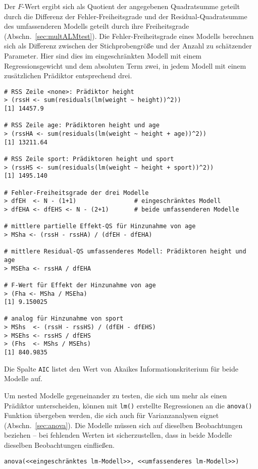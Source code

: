 Der $F$-Wert ergibt sich als Quotient der angegebenen Quadratsumme geteilt durch die Differenz der Fehler-Freiheitsgrade und der Residual-Quadratsumme des umfassenderen Modells geteilt durch ihre Freiheitsgrade (Abschn.\ \ref{sec:multALMtest}). Die Fehler-Freiheitsgrade eines Modells berechnen sich als Differenz zwischen der Stichprobengröße und der Anzahl zu schätzender Parameter. Hier sind dies im eingeschränkten Modell mit einem Regressionsgewicht und dem absoluten Term zwei, in jedem Modell mit einem zusätzlichen Prädiktor entsprechend drei.
\begin{lstlisting}
# RSS Zeile <none>: Prädiktor height
> (rssH <- sum(residuals(lm(weight ~ height))^2))
[1] 14457.9

# RSS Zeile age: Prädiktoren height und age
> (rssHA <- sum(residuals(lm(weight ~ height + age))^2))
[1] 13211.64

# RSS Zeile sport: Prädiktoren height und sport
> (rssHS <- sum(residuals(lm(weight ~ height + sport))^2))
[1] 1495.140

# Fehler-Freiheitsgrade der drei Modelle
> dfEH  <- N - (1+1)                # eingeschränktes Modell
> dfEHA <- dfEHS <- N - (2+1)       # beide umfassenderen Modelle

# mittlere partielle Effekt-QS für Hinzunahme von age
> MSha <- (rssH - rssHA) / (dfEH - dfEHA)

# mittlere Residual-QS umfassenderes Modell: Prädiktoren height und age
> MSEha <- rssHA / dfEHA

# F-Wert für Effekt der Hinzunahme von age
> (Fha <- MSha / MSEha)
[1] 9.150025

# analog für Hinzunahme von sport
> MShs  <- (rssH - rssHS) / (dfEH - dfEHS)
> MSEhs <- rssHS / dfEHS
> (Fhs  <- MShs / MSEhs)
[1] 840.9835
\end{lstlisting}

Die Spalte \lstinline!AIC! listet den Wert von Akaikes Informationskriterium für beide Modelle auf.

Um nested Modelle gegeneinander zu testen, die sich um mehr als einen Prädiktor unterscheiden, können mit \lstinline!lm()! erstellte Regressionen an die \lstinline!anova()! Funktion übergeben werden, die sich auch für Varianzanalysen eignet (Abschn.\ \ref{sec:anova}). Die Modelle müssen sich auf dieselben Beobachtungen beziehen -- bei fehlenden Werten ist sicherzustellen, dass in beide Modelle dieselben Beobachtungen einfließen.
\begin{lstlisting}
anova(<<eingeschränktes lm-Modell>>, <<umfassenderes lm-Modell>>)
\end{lstlisting}

